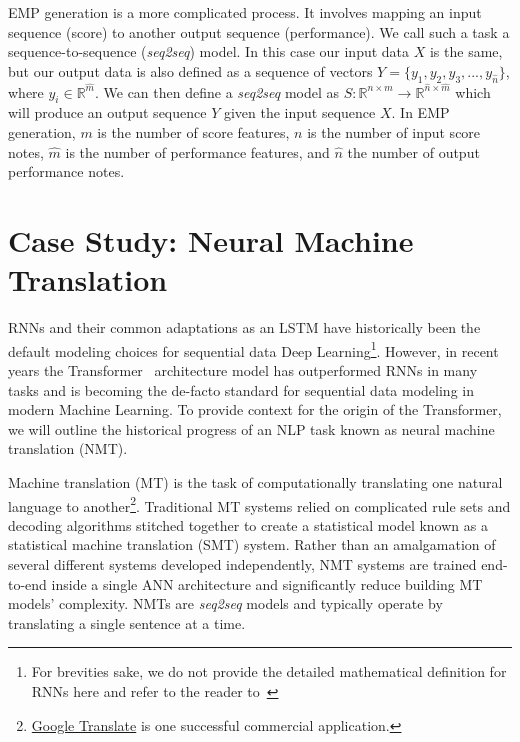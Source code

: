 \newcommand{\seq}{\emph{seq2seq}}

EMP generation is a more complicated process. It involves mapping an input sequence (score) to another output sequence (performance). We call such a task a sequence-to-sequence (\seq{}) model. In this case our input data $X$ is the same, but our output data is also defined as a sequence of vectors $Y = \{y_1, y_2, y_3, ..., y_{\hat{n}}\}$, where $y_i \in \mathbb{R}^{\hat{m}}$. We can then define a \seq{} model as $S: \mathbb{R}^{n \times m} \rightarrow \mathbb{R}^{\hat{n} \times \hat{m}}$ which will produce an output sequence $Y$ given the input sequence $X$. In EMP generation, $m$ is the number of score features, $n$ is the number of input score notes, $\hat{m}$ is the number of performance features, and $\hat{n}$ the number of output performance notes. 

\section{Case Study: Neural Machine Translation}
RNNs and their common adaptations as an LSTM have historically been the default modeling choices for sequential data Deep Learning\footnote{For brevities sake, we do not provide the detailed mathematical definition for RNNs here and refer to the reader to~\citet{goodfellow2016deep}}. However, in recent years the Transformer~\cite{vaswani2017attention} architecture model has outperformed RNNs in many tasks and is becoming the de-facto standard for sequential data modeling in modern Machine Learning. To provide context for the origin of the Transformer, we will outline the historical progress of an NLP task known as neural machine translation (NMT). 

Machine translation (MT) is the task of computationally translating one natural language to another\footnote{\href{https://translate.google.com/}{Google Translate} is one successful commercial application.}. Traditional MT systems relied on complicated rule sets and decoding algorithms stitched together to create a statistical model known as a statistical machine translation (SMT) system. Rather than an amalgamation of several different systems developed independently, NMT systems are trained end-to-end inside a single ANN architecture and significantly reduce building MT models' complexity. NMTs are \seq{} models and typically operate by translating a single sentence at a time.

